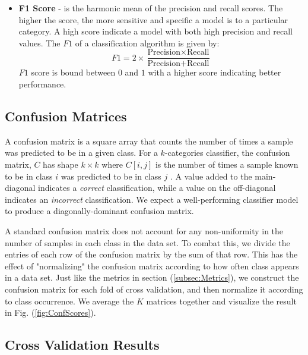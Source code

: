 \documentclass[conference,onecolumn,letterpaper]{IEEEtran}
\begin{document}
\begin{itemize}
    \item \textbf{F1 Score} - is the harmonic mean of the precision and recall scores. The higher the score, the more sensitive and specific a model is to a particular category. A high score indicate a model with both high precision and recall values. The $F1$ of a classification algorithm is given by:
    \begin{equation}
        F1 = 2 \times \frac{\text{Precision} \times \text{Recall}}{\text{Precision} + \text{Recall}}
    \end{equation}
    $F1$ score is bound between $0$ and $1$ with a higher score indicating better performance.
\end{itemize}


\subsection{Confusion Matrices}
\label{subsec:Confusion}

A confusion matrix is a square array that counts the number of times a sample was predicted to be in a given class. For a $k$-categories classifier, the confusion matrix, $C$ has shape $k \times k$ where $C[i,j]$ is the number of times a sample known to be in class $i$ was predicted to be in class $j$ \cite{Geron}. A value added to the main-diagonal indicates a \textit{correct} classification, while a value on the off-diagonal indicates an \textit{incorrect} classification. We expect a well-performing classifier model to produce a diagonally-dominant confusion matrix.

A standard confusion matrix does not account for any non-uniformity in the number of samples in each class in the data set. To combat this, we divide the entries of each row of the confusion matrix by the sum of that row. This has the effect of "normalizing" the confusion matrix according to how often class appears in a data set. Just like the metrics in section (\ref{subsec:Metrics}), we construct the confusion matrix for each fold of cross validation, and then normalize it according to class occurrence. We average the $K$ matrices together and visualize the result in Fig. (\ref{fig:ConfScores}).



\subsection{Cross Validation Results}
\label{subsec:Results}
\end{document}
